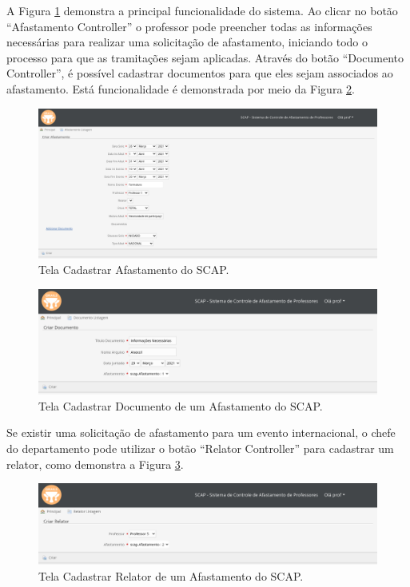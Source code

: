 A Figura \ref{fig-projeto-cadastrar-afastamento} demonstra a principal funcionalidade do sistema. Ao clicar no botão ``Afastamento Controller'' o professor pode preencher todas as informações necessárias para realizar uma solicitação de afastamento, iniciando todo o processo para que as tramitações sejam aplicadas. Através do botão ``Documento Controller'', é possível cadastrar documentos para que eles sejam associados ao afastamento. Está funcionalidade é demonstrada por meio da Figura \ref{fig-projeto-cadastrar-documento}.   

\begin{figure}[h]
	\centering
	\includegraphics[scale=0.33]{figuras/fig-projeto-cadastrar-afastamento} 
	\caption{Tela Cadastrar Afastamento do SCAP.}
	\label{fig-projeto-cadastrar-afastamento}
\end{figure}

\begin{figure}[h]
	\centering
	\includegraphics[scale=0.33]{figuras/fig-projeto-cadastrar-documento} 
	\caption{Tela Cadastrar Documento de um Afastamento do SCAP.}
	\label{fig-projeto-cadastrar-documento}
\end{figure}

Se existir uma solicitação de afastamento para um evento internacional, o chefe do departamento pode utilizar o botão ``Relator Controller'' para cadastrar um relator, como demonstra a Figura \ref{fig-projeto-cadastrar-relator}. 

\begin{figure}[h]
	\centering
	\includegraphics[scale=0.33]{figuras/fig-projeto-cadastrar-relator} 
	\caption{Tela Cadastrar Relator de um Afastamento do SCAP.}
	\label{fig-projeto-cadastrar-relator}
\end{figure}

